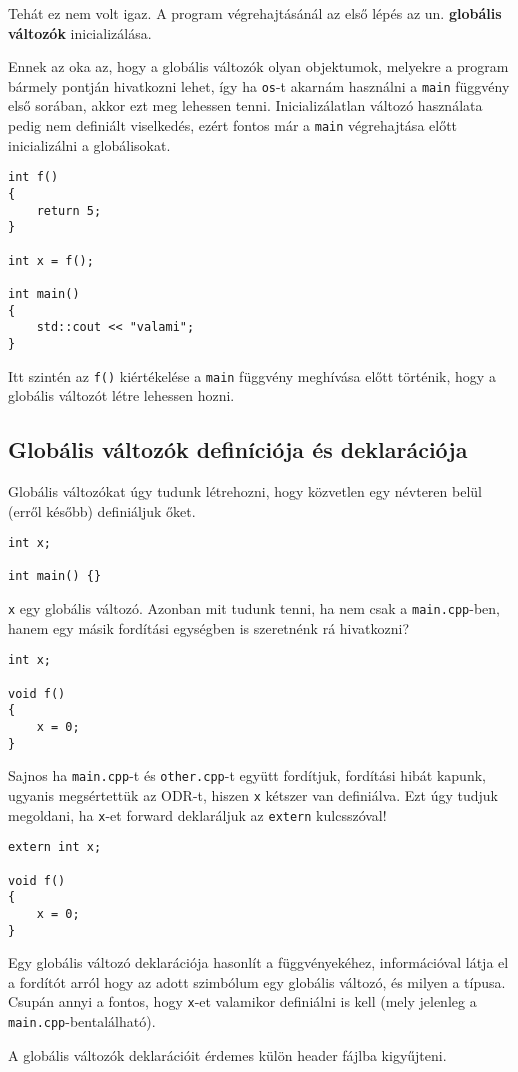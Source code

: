 \documentclass[../cpp_book/cpp_book.tex]{subfiles}
\begin{document}
	Tehát ez nem volt igaz. A program végrehajtásánál az első lépés az un. \textbf{globális változók} inicializálása. 
	
	Ennek az oka az, hogy a globális változók olyan objektumok, melyekre a program bármely pontján hivatkozni lehet, így ha \texttt{os}-t akarnám használni a \texttt{main} függvény első sorában, akkor ezt meg lehessen tenni. Inicializálatlan változó használata pedig nem definiált viselkedés, ezért fontos már a \texttt{main} végrehajtása előtt inicializálni a globálisokat.
	\begin{lstlisting}
int f()
{
	return 5;
}

int x = f();

int main()
{
	std::cout << "valami";
}
	\end{lstlisting}
	Itt szintén az \texttt{f()} kiértékelése a \texttt{main} függvény meghívása előtt történik, hogy a globális változót létre lehessen hozni.
	\subsection{Globális változók definíciója és deklarációja}
	Globális változókat úgy tudunk létrehozni, hogy közvetlen egy névteren belül (erről később) definiáljuk őket.
	\medskip
	
	\begin{lstlisting}
int x;

int main() {}
	\end{lstlisting}
	\texttt{x} egy globális változó. Azonban mit tudunk tenni, ha nem csak a \texttt{main.cpp}-ben, hanem egy másik fordítási egységben is szeretnénk rá hivatkozni?
	\medskip
	
	\begin{lstlisting}
int x;

void f() 
{
	x = 0;
}
	\end{lstlisting}
  Sajnos ha \texttt{main.cpp}-t és \texttt{other.cpp}-t együtt fordítjuk, fordítási hibát kapunk, ugyanis megsértettük az ODR-t, hiszen \texttt{x} kétszer van definiálva. Ezt úgy tudjuk megoldani, ha \texttt{x}-et forward deklaráljuk az \texttt{extern} kulcsszóval!
	\medskip
	
	\begin{lstlisting}
extern int x;

void f() 
{
	x = 0;
}
	\end{lstlisting}
	Egy globális változó deklarációja hasonlít a függvényekéhez, információval látja el a fordítót arról hogy az adott szimbólum egy globális változó, és milyen a típusa. Csupán annyi a fontos, hogy \texttt{x}-et valamikor definiálni is kell (mely jelenleg a \texttt{main.cpp}-bentalálható).
	\begin{note}
		A globális változók deklarációit érdemes külön header fájlba kigyűjteni.
	\end{note}
\end{document}
